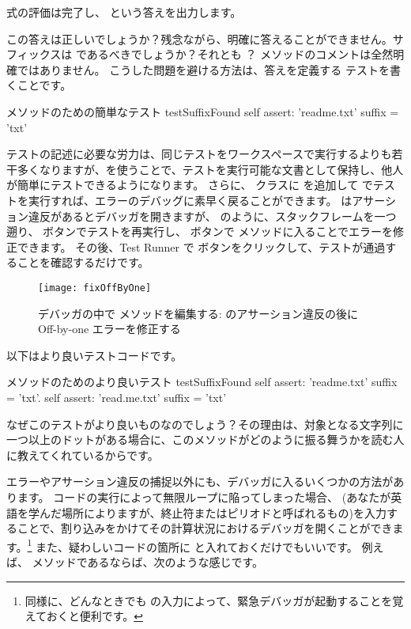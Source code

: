 \documentclass[a4paper,10pt,twoside]{book}
\begin{document}
 式の評価は完了し、 という答えを出力します。

この答えは正しいでしょうか？残念ながら、明確に答えることができません。サフィックスは  であるべきでしょうか？それとも  ？
 メソッドのコメントは全然明確ではありません。
こうした問題を避ける方法は、答えを定義する  テストを書くことです。

\begin{method}[testSuffix]{ メソッドのための簡単なテスト}
testSuffixFound
self assert: 'readme.txt' suffix = 'txt'
\end{method}

テストの記述に必要な労力は、同じテストをワークスペースで実行するよりも若干多くなりますが、\sunit を使うことで、テストを実行可能な文書として保持し、他人が簡単にテストできるようになります。
さらに、 クラスに  を追加して \sunit でテストを実行すれば、エラーのデバッグに素早く戻ることができます。
\sunit はアサーション違反があるとデバッガを開きますが、 のように、スタックフレームを一つ遡り、 ボタンでテストを再実行し、 ボタンで  メソッドに入ることでエラーを修正できます。
その後、\sunit Test Runner で  ボタンをクリックして、テストが通過することを確認するだけです。

\begin{figure}[btp]
\begin{center}
\texttt{[image: fixOffByOne]}
\end{center}
\caption{デバッガの中で  メソッドを編集する: \sunit のアサーション違反の後にOff-by-one エラーを修正する}
\end{figure}

以下はより良いテストコードです。

\begin{method}[testSuffix2]{ メソッドのためのより良いテスト}
testSuffixFound
self assert: 'readme.txt' suffix = 'txt'.
self assert: 'read.me.txt' suffix = 'txt'
\end{method}
\noindent
なぜこのテストがより良いものなのでしょう？その理由は、対象となる文字列に一つ以上のドットがある場合に、このメソッドがどのように振る舞うかを読む人に教えてくれているからです。

エラーやアサーション違反の捕捉以外にも、デバッガに入るいくつかの方法があります。
コードの実行によって無限ループに陥ってしまった場合、  (あなたが英語を学んだ場所によりますが、終止符またはピリオドと呼ばれるもの)を入力することで、割り込みをかけてその計算状況におけるデバッガを開くことができます。\footnote{同様に、どんなときでも  の入力によって、緊急デバッガが起動することを覚えておくと便利です。}
また、疑わしいコードの箇所に  と入れておくだけでもいいです。
例えば、 メソッドであるならば、次のような感じです。
\end{document}
